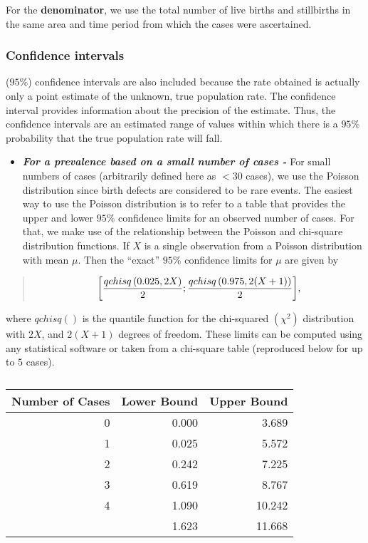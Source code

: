 \documentclass[
]{krantz}
\providecommand{\tightlist}{%
  \setlength{\itemsep}{0pt}\setlength{\parskip}{0pt}}
\begin{document}
For the \textbf{denominator}, we use the total number of live births and stillbirths in the same area and time period from which the cases were ascertained.

\hypertarget{confidence-intervals}{%
\subsubsection*{Confidence intervals}\label{confidence-intervals}}


(\(95\%\)) confidence intervals are also included because the rate obtained is actually only a point estimate of the unknown, true population rate. The confidence interval provides information about the precision of the estimate. Thus, the confidence intervals are an estimated range of values within which there is a \(95\%\) probability that the true population rate will fall.

\begin{itemize}
\tightlist
\item
  \textbf{\emph{For a prevalence based on a small number of cases -}} For small numbers of cases (arbitrarily defined here as \(< 30\) cases), we use the Poisson distribution since birth defects are considered to be rare events. The easiest way to use the Poisson distribution is to refer to a table that provides the upper and lower \(95\%\) confidence limits for an observed number of cases. For that, we make use of the relationship between the Poisson and chi-square distribution functions. If \(X\) is a single observation from a Poisson distribution with mean \(\mu\). Then the ``exact'' \(95\%\) confidence limits for \(\mu\) are given by
\end{itemize}

\begin{quote}
\[
\small{
\left[\dfrac{qchisq\left(0.025, 2X\right)}{2}; \dfrac{qchisq\left(0.975, 2(X+1)\right)}{2}\right]},
\]
\end{quote}

where \(qchisq()\) is the quantile function for the chi-squared \(\left(\chi^{2}\right)\) distribution with \(2X\), and \(2(X+1)\) degrees of freedom. These limits can be computed using any statistical software or taken from a chi-square table (reproduced below for up to \(5\) cases).

\begin{table}

\caption{\label{tab:pois1}}
\centering
\begin{tabular}[t]{rrr}
\toprule
Number of Cases & Lower Bound & Upper Bound\\
\midrule
0 & 0.000 & 3.689\\
1 & 0.025 & 5.572\\
2 & 0.242 & 7.225\\
3 & 0.619 & 8.767\\
4 & 1.090 & 10.242\\
\addlinespace
5 & 1.623 & 11.668\\
\bottomrule
\end{tabular}
\end{table}
\end{document}
